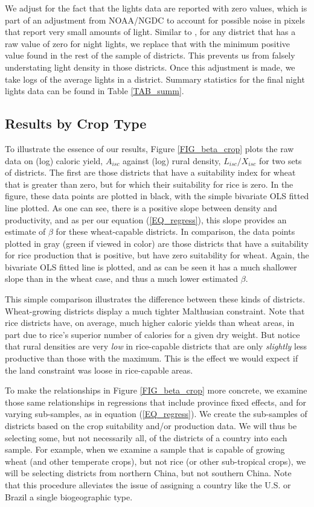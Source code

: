 \documentclass[11pt]{article}
\begin{document}
We adjust for the fact that the lights data are reported with zero values, which is part of an adjustment from NOAA/NGDC to account for possible noise in pixels that report very small amounts of light. Similar to \citet{hssw2016}, for any district that has a raw value of zero for night lights, we replace that with the minimum positive value found in the rest of the sample of districts. This prevents us from falsely understating light density in those districts. Once this adjustment is made, we take logs of the average lights in a district. Summary statistics for the final night lights data can be found in Table \ref{TAB_summ}.

\subsection{Results by Crop Type}
To illustrate the essence of our results, Figure \ref{FIG_beta_crop} plots the raw data on (log) caloric yield, $A_{isc}$ against (log) rural density, $L_{isc}/X_{isc}$ for two sets of districts. The first are those districts that have a suitability index for wheat that is greater than zero, but for which their suitability for rice is zero. In the figure, these data points are plotted in black, with the simple bivariate OLS fitted line plotted. As one can see, there is a positive slope between density and productivity, and as per our equation (\ref{EQ_regress}), this slope provides an estimate of $\beta$ for these wheat-capable districts. In comparison, the data points plotted in gray (green if viewed in color) are those districts that have a suitability for rice production that is positive, but have zero suitability for wheat. Again, the bivariate OLS fitted line is plotted, and as can be seen it has a much shallower slope than in the wheat case, and thus a much lower estimated $\beta$.

This simple comparison illustrates the difference between these kinds of districts. Wheat-growing districts display a much tighter Malthusian constraint. Note that rice districts have, on average, much higher caloric yields than wheat areas, in part due to rice's superior number of calories for a given dry weight. But notice that rural densities are very \textit{low} in rice-capable districts that are only \textit{slightly} less productive than those with the maximum. This is the effect we would expect if the land constraint was loose in rice-capable areas.

To make the relationships in Figure \ref{FIG_beta_crop} more concrete, we examine those same relationships in regressions that include province fixed effects, and for varying sub-samples, as in equation (\ref{EQ_regress}). We create the sub-samples of districts based on the crop suitability and/or production data. We will thus be selecting some, but not necessarily all, of the districts of a country into each sample. For example, when we examine a sample that is capable of growing wheat (and other temperate crops), but not rice (or other sub-tropical crops), we will be selecting districts from northern China, but not southern China. Note that this procedure alleviates the issue of assigning a country like the U.S. or Brazil a single biogeographic type.
\end{document}
